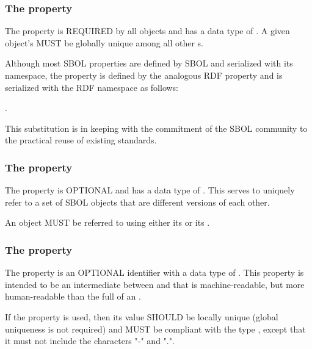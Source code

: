 \subsubsection*{The  property}
\label{sec:identity}
The  property is REQUIRED by all  objects and has a data type of . A given  object's   MUST be globally unique among all other  s. 

Although most SBOL properties are defined by SBOL and serialized with its namespace, the  property is defined by the analogous RDF  property and is serialized with the RDF namespace as follows:

.

This substitution is in keeping with the commitment of the SBOL community to the practical reuse of existing standards.

\subsubsection*{The  property}
\label{sec:persistentIdentity}
The  property is OPTIONAL and has a data type of . This  serves to uniquely refer to a set of SBOL objects that are different versions of each other. 

An  object MUST be referred to using either its   or its  .

\subsubsection*{The  property}
\label{sec:displayId}
The  property is an OPTIONAL identifier with a data type of . This property is intended to be an intermediate between  and  that is machine-readable, but more human-readable than the full  of an . 

If the  property is used, then its  value SHOULD be locally unique (global uniqueness is not required) and MUST be compliant with the type , except that it must not include the characters "-" and ".". 

